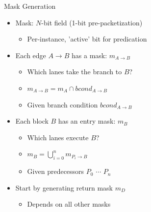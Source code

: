 \begin{frame}{Mask Generation}

\begin{minipage}[t]{0.50\linewidth}

\begin{itemize}
    \item Mask: $N$-bit field (1-bit pre-packetization)
    \begin{itemize}
        \item Per-instance, 'active' bit for predication
    \end{itemize}
    \item Each edge $A \rightarrow B$ has a mask: $m_{A \rightarrow B}$
    \begin{itemize}
        \item Which lanes take the branch to $B$?
        \item $m_{A \rightarrow B} = m_A \cap bcond_{A \rightarrow B}$
        \item Given branch condition $bcond_{A \rightarrow B}$
    \end{itemize}
    \item Each block $B$ has an entry mask: $m_B$
    \begin{itemize}
        \item Which lanes execute $B$?
        \item $m_B = \bigcup\limits_{i=0}^n  m_{P_i \rightarrow B}$
        \item Given predecessors $P_0$ $\cdots$ $P_n$
    \end{itemize}
    \item Start by generating return mask $m_D$
    \begin{itemize}
        \item Depends on all other masks
    \end{itemize}
\end{itemize}

\end{minipage}
\hspace{1em}
\begin{minipage}[t]{0.43\linewidth}


\end{minipage}
\end{frame}
